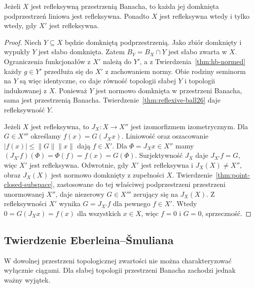 \begin{wniosek}
\label{cor:reflexivity-stability26}
Jeżeli $X$ jest refleksywną przestrzenią Banacha, to każda
jej domknięta podprzestrzeń liniowa jest refleksywna.
Ponadto $X$ jest refleksywna wtedy i tylko wtedy, gdy $X'$
jest refleksywna.
\end{wniosek}
\begin{proof}
Niech $Y\subseteq X$ będzie domkniętą podprzestrzenią.
Jako zbiór domknięty i wypukły $Y$ jest słabo domknięta.
Zatem $B_Y=B_X\cap Y$ jest słabo zwarta w $X$.
Ograniczenia funkcjonałów z $X'$ należą do $Y'$,
a z Twierdzenia~\ref{thm:hb-normed} każdy $g\in Y'$
przedłuża się do $X'$ z zachowaniem normy.
Obie rodziny seminorm na $Y$ są więc identyczne,
co daje równość topologii słabej $Y$ i topologii
indukowanej z $X$. Ponieważ $Y$ jest normowo domknięta
w przestrzeni Banacha, sama jest przestrzenią Banacha. Twierdzenie~\ref{thm:reflexive-ball26}
daje refleksywność $Y$.

Jeżeli $X$ jest refleksywna, to $J_X:X\to X''$ jest
izomorfizmem izometrycznym. Dla $G\in X'''$ określamy
$f(x)=G(J_Xx)$. Liniowość oraz oszacowanie
$|f(x)|\le\|G\|\|x\|$ dają $f\in X'$.
Dla $\Phi=J_Xx\in X''$
mamy $(J_{X'}f)(\Phi)=\Phi(f)=f(x)=G(\Phi)$.
Surjektywność $J_X$ daje $J_{X'}f=G$, więc $X'$ jest refleksywna.
Odwrotnie, gdy $X'$ jest refleksywna i $J_X(X)\ne X''$,
obraz $J_X(X)$ jest normowo domknięty z zupełności $X$.
Twierdzenie~\ref{thm:point-closed-subspace}, zastosowane
do tej właściwej podprzestrzeni przestrzeni unormowanej $X''$,
daje niezerowy $G\in X'''$ zerujący się na $J_X(X)$.
Z refleksywności $X'$ wynika $G=J_{X'}f$ dla pewnego $f\in X'$.
Wtedy $0=G(J_Xx)=f(x)$ dla wszystkich $x\in X$, więc
$f=0$ i $G=0$, sprzeczność.
\end{proof}

\subsection{Twierdzenie Eberleina--\v Smuliana}

W dowolnej przestrzeni topologicznej zwartości nie można
charakteryzować wyłącznie ciągami. Dla słabej topologii
przestrzeni Banacha zachodzi jednak ważny wyjątek.

